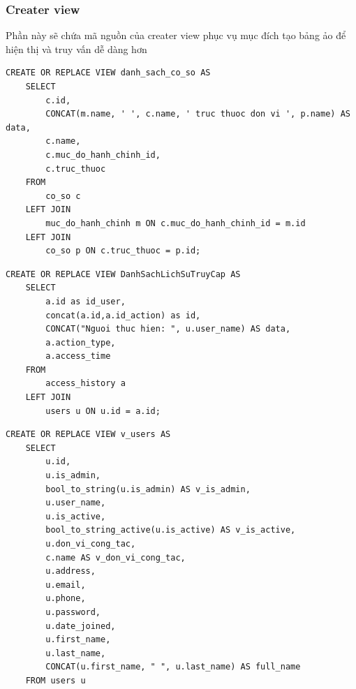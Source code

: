 \documentclass{article} %
\begin{document}
\newpage


\subsubsection{Creater view}

Phần này sẽ chứa mã nguồn của creater view phục vụ mục đích tạo bảng ảo để hiện thị và truy vấn dễ dàng hơn

\begin{lstlisting}[caption={DanhSachCoSo Creater View Definition}, label={tab:danhsachcosoView}]   
    CREATE OR REPLACE VIEW danh_sach_co_so AS
    SELECT 
        c.id, 
        CONCAT(m.name, ' ', c.name, ' truc thuoc don vi ', p.name) AS data,
        c.name,
        c.muc_do_hanh_chinh_id,
        c.truc_thuoc
    FROM 
        co_so c
    LEFT JOIN 
        muc_do_hanh_chinh m ON c.muc_do_hanh_chinh_id = m.id
    LEFT JOIN 
        co_so p ON c.truc_thuoc = p.id;    
\end{lstlisting}


\begin{lstlisting}[caption={DanhSachLichSuTruyCap Creater View Definition}, label={tab:DanhSachLichSuTruyCapView}]   
    CREATE OR REPLACE VIEW DanhSachLichSuTruyCap AS
    SELECT 
        a.id as id_user,
        concat(a.id,a.id_action) as id, 
        CONCAT("Nguoi thuc hien: ", u.user_name) AS data,
        a.action_type,
        a.access_time
    FROM 
        access_history a
    LEFT JOIN 
        users u ON u.id = a.id;   
\end{lstlisting}
\newpage
\begin{lstlisting}[caption={VUsers Creater View Definition}, label={tab:VuUsersView}]   
    CREATE OR REPLACE VIEW v_users AS
    SELECT 
        u.id,
        u.is_admin,
        bool_to_string(u.is_admin) AS v_is_admin,
        u.user_name,
        u.is_active,
        bool_to_string_active(u.is_active) AS v_is_active,
        u.don_vi_cong_tac,
        c.name AS v_don_vi_cong_tac,
        u.address,
        u.email,
        u.phone,
        u.password,
        u.date_joined,
        u.first_name,
        u.last_name,
        CONCAT(u.first_name, " ", u.last_name) AS full_name
    FROM users u   
\end{lstlisting}
\end{document}
